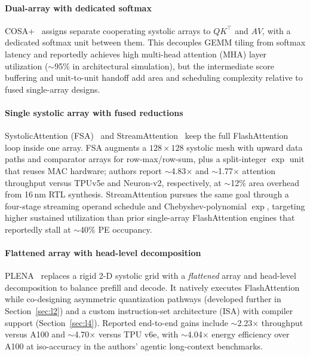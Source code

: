 \documentclass[conference]{IEEEtran}
\begin{document}
\paragraph{Dual-array with dedicated softmax}
COSA+~\cite{wang2023cosa} assigns separate cooperating systolic arrays to $QK^\top$ and $AV$, with a dedicated softmax unit between them.
This decouples GEMM tiling from softmax latency and reportedly achieves high multi-head attention (MHA) layer utilization ($\sim$95\% in architectural simulation), but the intermediate score buffering and unit-to-unit handoff add area and scheduling complexity relative to fused single-array designs.

\paragraph{Single systolic array with fused reductions}
SystolicAttention (FSA)~\cite{lin2025systolicattention} and StreamAttention~\cite{streamattention2025} keep the full FlashAttention loop inside one array.
FSA augments a $128 \times 128$ systolic mesh with upward data paths and comparator arrays for row-max/row-sum, plus a split-integer $\exp$ unit that reuses MAC hardware; authors report $\sim$4.83$\times$ and $\sim$1.77$\times$ attention throughput versus TPUv5e and Neuron-v2, respectively, at $\sim$12\% area overhead from 16\,nm RTL synthesis.
StreamAttention pursues the same goal through a four-stage streaming operand schedule and Chebyshev-polynomial $\exp$, targeting higher sustained utilization than prior single-array FlashAttention engines that reportedly stall at $\sim$40\% PE occupancy.

\paragraph{Flattened array with head-level decomposition}
PLENA~\cite{plena2025} replaces a rigid 2-D systolic grid with a \emph{flattened} array and head-level decomposition to balance prefill and decode.
It natively executes FlashAttention while co-designing asymmetric quantization pathways (developed further in Section~\ref{sec:l2}) and a custom instruction-set architecture (ISA) with compiler support (Section~\ref{sec:l4}).
Reported end-to-end gains include $\sim$2.23$\times$ throughput versus A100 and $\sim$4.70$\times$ versus TPU v6e, with $\sim$4.04$\times$ energy efficiency over A100 at iso-accuracy in the authors' agentic long-context benchmarks.
\end{document}
